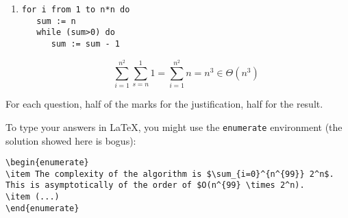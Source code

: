 \begin{enumerate}
\item
\begin{verbatim}
for i from 1 to n*n do
   sum := n
   while (sum>0) do
      sum := sum - 1
\end{verbatim}

  \begin{spaceForAnswer}
    \answerbox
  \end{spaceForAnswer}

\begin{solution}
$$\sum_{i=1}^{n^2} \sum_{s=n}^1 1 = \sum_{i=1}^{n^2} n = n^3 \in \Theta(n^3)$$
\end{solution}


\end{enumerate}

\begin{markingScheme}
For each question, half of the marks for the justification, half for the result.
\end{markingScheme}

\begin{codeExample}
  To type your answers in \LaTeX, you might use the \verb+enumerate+
  environment (the solution showed here is bogus):
\begin{verbatim}
\begin{enumerate}
\item The complexity of the algorithm is $\sum_{i=0}^{n^{99}} 2^n$.
This is asymptotically of the order of $O(n^{99} \times 2^n).
\item (...)
\end{enumerate}
\end{verbatim}
\end{codeExample}
